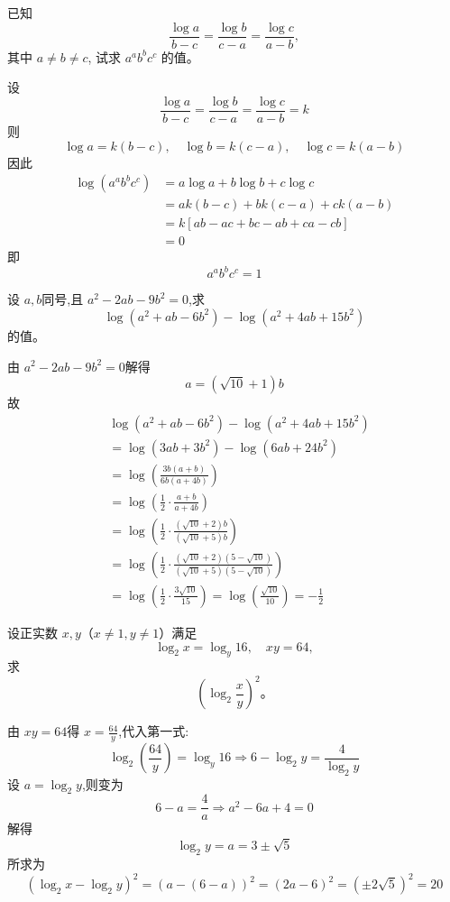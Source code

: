 \begin{questions}
    \question 已知 
    \[
    \frac{\log a}{b - c} = \frac{\log b}{c - a} = \frac{\log c}{a - b},
    \]
    其中 $a \neq b \neq c$, 试求 $a^{a}b^{b}c^{c}$ 的值。
    \begin{solution}
        设
        \[
        \frac{\log a}{b-c} = \frac{\log b}{c-a} = \frac{\log c}{a-b} = k
        \]
        则
        \[
        \log a = k(b-c), \quad \log b = k(c-a), \quad \log c = k(a-b)
        \]
        因此
        \begin{align*}
        \log(a^a b^b c^c) &= a\log a + b\log b + c\log c \\
        &= ak(b-c) + bk(c-a) + ck(a-b) \\
        &= k[ab - ac + bc - ab + ca - cb] \\
        &= 0
        \end{align*}
        即 
        \[
        a^a b^b c^c = 1
        \]
    \end{solution}

    \question 设 $a,b$同号,且 $a^2 - 2ab - 9b^2 = 0$,求
    \[
    \log(a^2 + ab - 6b^2) - \log(a^2 + 4ab + 15b^2)
    \]
    的值。
    \begin{solution}
        由 $a^2 - 2ab - 9b^2 = 0 $解得
        $$a = (\sqrt{10} + 1)b$$
        故
        \begin{align*}
        &\log(a^2 + ab - 6b^2) - \log(a^2 + 4ab + 15b^2) \\
        &= \log(3ab + 3b^2) - \log(6ab + 24b^2) \\
        &= \log\left(\frac{3b(a + b)}{6b(a + 4b)}\right)\\
        &= \log\left(\frac{1}{2} \cdot \frac{a + b}{a + 4b}\right) \\
        &= \log\left(\frac{1}{2} \cdot \frac{(\sqrt{10} + 2)b}{(\sqrt{10} + 5)b}\right) \\
        &= \log\left(\frac{1}{2} \cdot \frac{(\sqrt{10} + 2)(5 - \sqrt{10})}{(\sqrt{10} + 5)(5 - \sqrt{10})}\right) \\
        &= \log\left(\frac{1}{2} \cdot \frac{3\sqrt{10}}{15}\right)= \log\left(\frac{\sqrt{10}}{10}\right) = -\frac{1}{2}
        \end{align*}
    \end{solution}

    \question 设正实数 \( x, y \)（\( x \neq 1, y \neq 1 \)）满足
    \[
    \log_2 x = \log_y 16, \quad xy = 64,
    \]
    求
    \[
    \left(\log_2 \frac{x}{y}\right)^2。
    \]
    \begin{solution}
        由 \(xy = 64\)得 \(x = \frac{64}{y}\),代入第一式:
        \[
        \log_2 \left( \frac{64}{y} \right) = \log_y 16
        \Rightarrow 6 - \log_2 y = \frac{4}{\log_2 y}
        \]
        设 \(a = \log_2 y\),则变为
        \[
        6 - a = \frac{4}{a} \Rightarrow a^2 - 6a + 4 = 0
        \]
        解得
        \[
        \log_2 y =a= 3 \pm \sqrt{5}
        \]
        所求为
        \[
        \left(\log_2 x - \log_2 y\right)^2 = (a - (6 - a))^2 = (2a - 6)^2 = (\pm 2\sqrt{5})^2 = 20
        \]
    \end{solution}
    

\end{questions}
